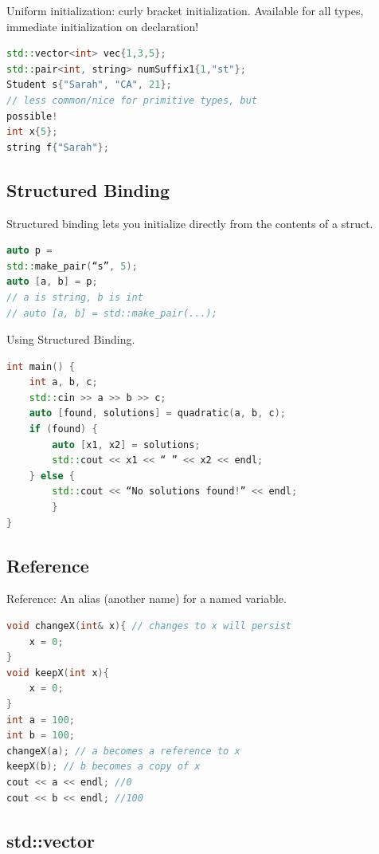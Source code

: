 \documentclass[12pt, a4paper, oneside]{ctexbook}
\begin{document}
Uniform initialization: curly
bracket initialization. Available
for all types, immediate
initialization on declaration!

\begin{lstlisting}[language=c++]
std::vector<int> vec{1,3,5};
std::pair<int, string> numSuffix1{1,"st"};
Student s{"Sarah", "CA", 21};
// less common/nice for primitive types, but
possible!
int x{5};
string f{"Sarah"};
\end{lstlisting}

\subsection{Structured Binding}

Structured binding lets you initialize directly from
the contents of a struct.

\begin{lstlisting}[language=c++]
auto p =
std::make_pair(“s”, 5);
auto [a, b] = p;
// a is string, b is int
// auto [a, b] = std::make_pair(...);
\end{lstlisting}

Using Structured Binding.


\begin{lstlisting}[language=c++]
int main() {
    int a, b, c;
    std::cin >> a >> b >> c;
    auto [found, solutions] = quadratic(a, b, c);
    if (found) {
        auto [x1, x2] = solutions;
        std::cout << x1 << “ ” << x2 << endl;
    } else {
        std::cout << “No solutions found!” << endl;
        }
}
\end{lstlisting}

\subsection{Reference}

Reference: An alias
(another name) for a
named variable.

\begin{lstlisting}[language=c++]
void changeX(int& x){ // changes to x will persist
    x = 0;
}
void keepX(int x){
    x = 0;
}
int a = 100;
int b = 100;
changeX(a); // a becomes a reference to x
keepX(b); // b becomes a copy of x
cout << a << endl; //0
cout << b << endl; //100
\end{lstlisting}

\subsection{std::vector}
\end{document}
